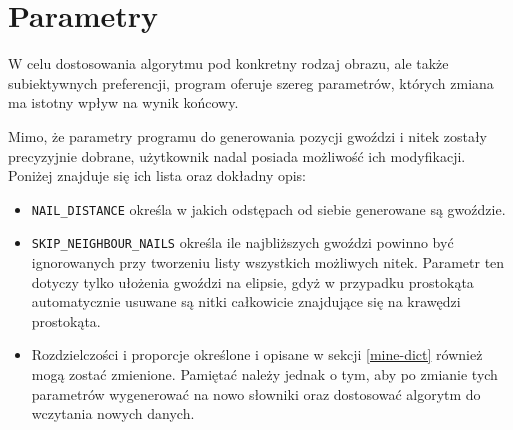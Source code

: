     \section{Parametry} \label{mine-param}
    W celu dostosowania algorytmu pod konkretny rodzaj obrazu, ale także subiektywnych preferencji, program oferuje szereg parametrów, których zmiana ma istotny wpływ na wynik końcowy.
    
    Mimo, że parametry programu do generowania pozycji gwoździ i nitek zostały precyzyjnie dobrane, użytkownik nadal posiada możliwość ich modyfikacji. Poniżej znajduje się ich lista oraz dokładny opis:
    \begin{itemize}
        \item \texttt{NAIL_DISTANCE} określa w jakich odstępach od siebie generowane są gwoździe.
        \item \texttt{SKIP_NEIGHBOUR_NAILS} określa ile najbliższych gwoździ powinno być ignorowanych przy tworzeniu listy wszystkich możliwych nitek. Parametr ten dotyczy tylko ułożenia gwoździ na elipsie, gdyż w przypadku prostokąta automatycznie usuwane są nitki całkowicie znajdujące się na krawędzi prostokąta.
        \item Rozdzielczości i proporcje określone i opisane w sekcji \ref{mine-dict} również mogą zostać zmienione. Pamiętać należy jednak o tym, aby po zmianie tych parametrów wygenerować na nowo słowniki oraz dostosować algorytm do wczytania nowych danych.
    \end{itemize}
    
